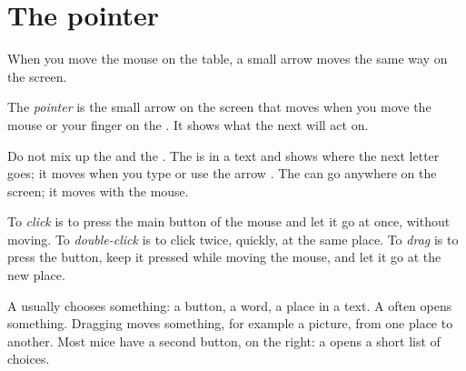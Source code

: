 \section{The pointer}

When you move the mouse on the table, a small arrow moves the same way on the
screen.

\begin{definition}[Pointer]\label{def:g2:keyboard-and-mouse:pointer}
The \emph{pointer} is the small arrow on the screen that moves
when you move the mouse or your finger on the . It shows what the
next  will act on.
\end{definition}

Do not mix up the  and the . The  is in a text and shows
where the next letter goes; it moves when you type or use the arrow . The
 can go anywhere on the screen; it moves with the mouse.

\begin{definition}\label{def:g2:keyboard-and-mouse:click}
To \emph{click} is to press the main button of the mouse and let
it go at once, without moving. To \emph{double-click} is
to click twice, quickly, at the same place. To \emph{drag} is to
press the button, keep it pressed while moving the mouse, and let it go at
the new place.
\end{definition}

A  usually chooses something: a button, a word, a place in a text. A
 often opens something. Dragging moves something, for example a
picture, from one place to another. Most mice have a second button, on the
right: a  opens a short list of choices.

